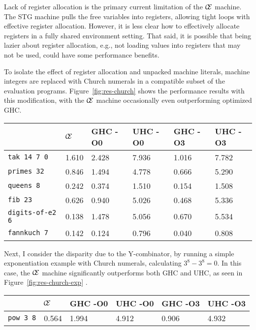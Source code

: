 Lack of register allocation is the primary current limitation of the $\mathcal{\mathcal{C} \mskip -4mu \mathcal{E}}$
machine. The STG machine pulls the free variables into registers, allowing tight
loops with effective register allocation. However, it is less clear how to
effectively allocate registers in a fully shared environment setting.  That
said, it is possible that being lazier about register allocation, e.g., not
loading values into registers that may not be used, could have some performance
benefits.

To isolate the effect of register allocation and unpacked machine
literals, machine integers are replaced with Church numerals in a compatible
subset of the evaluation programs. Figure~\ref{fig:res-church} shows the
performance results with this modification, with the $\mathcal{\mathcal{C}
\mskip -4mu \mathcal{E}}$ machine occasionally even outperforming optimized GHC.

\begin{figure*}
\centering
\begin{tabularx}{\textwidth}{l | X | X | X | X | X}
& $\mathcal{\mathcal{C} \mskip -4mu \mathcal{E}}$ & GHC -O0 & UHC -O0 & GHC -O3 & UHC -O3 \\
\hline
\texttt{tak 14 7 0} & 1.610 & 2.428 & 7.936 & 1.016 & 7.782 \\
\texttt{primes 32} & 0.846 & 1.494 & 4.778 & 0.666 & 5.290 \\
\texttt{queens 8} & 0.242 & 0.374 & 1.510 & 0.154 & 1.508 \\
\texttt{fib 23} & 0.626 & 0.940 & 5.026 & 0.468 & 5.336 \\
\texttt{digits-of-e2 6} & 0.138 & 1.478 & 5.056 & 0.670 & 5.534 \\
\texttt{fannkuch 7} & 0.142 & 0.124 & 0.796 & 0.040 & 0.808 \\
\end{tabularx}
\caption{Church Numeral Benchmark Results. Measurement is wall clock time, 
units are seconds. Times averaged over 5 runs ($\sigma < 20\%$).}
\label{fig:res-church}
\end{figure*}

Next, I consider the disparity due to the Y-combinator, by running a simple
exponentiation example with Church numerals, calculating $3^8 - 3^8 = 0$. In
this case, the $\mathcal{\mathcal{C} \mskip -4mu \mathcal{E}}$ machine
significantly outperforms both GHC and UHC, as seen in
Figure~\ref{fig:res-church-exp} .

\begin{figure*}
\begin{tabularx}{\textwidth}{l | X | X | X | X | X}
& $\mathcal{\mathcal{C} \mskip -4mu \mathcal{E}}$ & GHC -O0 & UHC -O0 & GHC -O3 & UHC -O3 \\
\hline
\texttt{pow 3 8} & 0.564 & 1.994 & 4.912 & 0.906 & 4.932 \\
\end{tabularx}
\caption{Church Numeral Exponentiation Benchmark Results. Measurement is wall clock time, 
units are seconds. Times averaged over 5 runs ($\sigma < 20\%$).}
\label{fig:res-church-exp}
\end{figure*}

